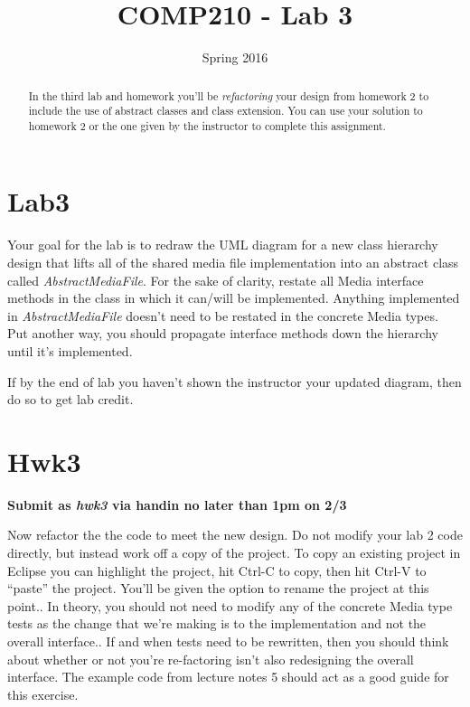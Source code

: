 \documentclass[]{tufte-handout}
\title{COMP210 - Lab 3}
\author{}
\date{ Spring 2016}
\begin{document}
\maketitle

\begin{abstract}
In the third lab and homework you'll be \textit{refactoring} your design from homework 2 to include the use of abstract classes and class extension. You can use your solution to homework 2 or the one given by the instructor to complete this assignment.
\end{abstract}

\section*{Lab3}

Your goal for the lab is to redraw the UML diagram for a new class hierarchy design that lifts all of the shared media file implementation into an abstract class called \textit{AbstractMediaFile}. For the sake of clarity, restate all Media interface methods in the class in which it can/will be implemented. Anything implemented in \textit{AbstractMediaFile} doesn't need to be restated in the concrete Media types. Put another way, you should propagate interface methods down the hierarchy until it's implemented. 

If by the end of lab you haven't shown the instructor your updated diagram, then do so to get lab credit.

\section*{Hwk3}

\begin{center}
\textbf{Submit as \textit{hwk3} via handin no later than 1pm on 2/3}
\end{center}

Now refactor the the code to meet the new design. Do not modify your lab 2 code directly, but instead work off a copy of the project. To copy an existing project in Eclipse you can highlight the project, hit Ctrl-C to copy, then hit Ctrl-V to ``paste'' the project. You'll be given the option to rename the project at this point.. In theory, you should not need to modify any of the concrete Media type tests as the change that we're making is to the implementation and not the overall interface.. If and when tests need to be rewritten, then you should think about whether or not you're re-factoring isn't also redesigning the overall interface. The example code from lecture notes 5 should act as a good guide for this exercise.
\end{document}

